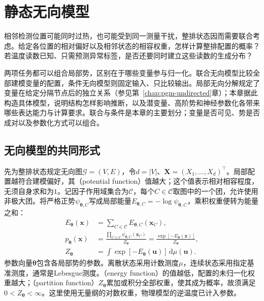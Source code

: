 \chapter{静态无向模型}
\label{chap:pgm-energy-models}

相邻检测位置可能同时过热，也可能受到同一测量干扰，整排状态因而需要联合考虑。给定各位置的相对偏好以及相邻状态的相容权重，怎样计算整排配置的概率？若温度读数已知、只需预测异常标签，是否还要同时建立这些读数的生成分布？

两项任务都可以组合局部势，区别在于哪些变量参与归一化。联合无向模型比较全部建模变量的配置，条件无向模型则固定输入、只比较输出。局部无向分解规定了变量在给定分隔节点后的独立关系（参见第~\ref{chap:pgm-undirected}章）；本章据此构造具体模型，说明结构怎样影响推断，以及潜变量、高阶势和神经参数化各带来哪些表达能力与计算要求。联合与条件是本章的主要划分；变量是否可见、势是否成对以及参数化方式可以组合。

\section{无向模型的共同形式}
\label{sec:pgm-energy-models-common}

先为整排状态规定无向图$\mathcal{G}=(V,E)$，令$d=|V|$、$\bm{X}=(X_1,\ldots,X_d)^\top$。局部配置越符合建模偏好，其（potential function）值越大；这个值表示相对相容程度，无须自身求和为$1$。记因子作用域集合为$\mathcal{C}$，每个$C\in\mathcal{C}$取图中的一个团，允许使用非极大团。将严格正势$\psi_{\bm{\theta},C}$写成局部能量$E_{\bm{\theta},C}=-\log\psi_{\bm{\theta},C}$，乘积权重便转为能量之和：
\begin{equation}
  \begin{aligned}
    E_{\bm{\theta}}(\bm{x})
      &=\sum_{C\in\mathcal{C}}E_{\bm{\theta},C}(\bm{x}_C),\\
    p_{\bm{\theta}}(\bm{x})
      &=\frac{\prod_{C\in\mathcal{C}}
               \psi_{\bm{\theta},C}(\bm{x}_C)}
              {Z_{\bm{\theta}}}
        =\frac{\exp[-E_{\bm{\theta}}(\bm{x})]}{Z_{\bm{\theta}}},\\
    Z_{\bm{\theta}}
      &=\int \exp[-E_{\bm{\theta}}(\bm{u})]\,\mathrm{d}\mu(\bm{u}).
  \end{aligned}
  \label{eq:pgm-energy-models-joint}
\end{equation}
参数向量$\bm{\theta}$包含各局部势的参数。离散状态采用计数测度$\mu$，连续状态采用指定基准测度，通常是Lebesgue测度。（energy function）的值越低，配置的未归一化权重越大；（partition function）$Z_{\bm{\theta}}$累加或积分全部权重，使其成为概率，故须满足$0<Z_{\bm{\theta}}<\infty$。这里使用无量纲的对数权重，物理模型的逆温度已计入参数。

